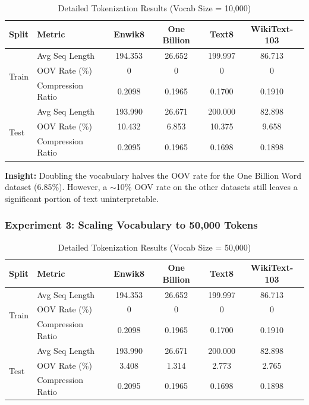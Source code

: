 \begin{table}[H]
\centering
\caption{Detailed Tokenization Results (Vocab Size = 10,000)}
\renewcommand{\arraystretch}{1.1}
\begin{tabular}{|l|l|c|c|c|c|}
\hline
\textbf{Split} & \textbf{Metric} & \textbf{Enwik8} & \textbf{One Billion} & \textbf{Text8} & \textbf{WikiText-103} \\ \hline
\multirow{3}{*}{Train} 
 & Avg Seq Length & 194.353 & 26.652 & 199.997 & 86.713 \\ \cline{2-6}
 & OOV Rate (\%) & 0 & 0 & 0 & 0 \\ \cline{2-6}
 & Compression Ratio & 0.2098 & 0.1965 & 0.1700 & 0.1910 \\ \hline
\multirow{3}{*}{Test}  
 & Avg Seq Length & 193.990 & 26.671 & 200.000 & 82.898 \\ \cline{2-6}
 & OOV Rate (\%) & 10.432 & 6.853 & 10.375 & 9.658 \\ \cline{2-6}
 & Compression Ratio & 0.2095 & 0.1965 & 0.1698 & 0.1898 \\ \hline
\end{tabular}
\end{table}

\textbf{Insight:} Doubling the vocabulary halves the OOV rate for the One Billion Word dataset (6.85\%). However, a $\sim$10\% OOV rate on the other datasets still leaves a significant portion of text uninterpretable.

\subsubsection{Experiment 3: Scaling Vocabulary to 50,000 Tokens}

\begin{table}[H]
\centering
\caption{Detailed Tokenization Results (Vocab Size = 50,000)}
\renewcommand{\arraystretch}{1.1}
\begin{tabular}{|l|l|c|c|c|c|}
\hline
\textbf{Split} & \textbf{Metric} & \textbf{Enwik8} & \textbf{One Billion} & \textbf{Text8} & \textbf{WikiText-103} \\ \hline
\multirow{3}{*}{Train} 
 & Avg Seq Length & 194.353 & 26.652 & 199.997 & 86.713 \\ \cline{2-6}
 & OOV Rate (\%) & 0 & 0 & 0 & 0 \\ \cline{2-6}
 & Compression Ratio & 0.2098 & 0.1965 & 0.1700 & 0.1910 \\ \hline
\multirow{3}{*}{Test}  
 & Avg Seq Length & 193.990 & 26.671 & 200.000 & 82.898 \\ \cline{2-6}
 & OOV Rate (\%) & 3.408 & 1.314 & 2.773 & 2.765 \\ \cline{2-6}
 & Compression Ratio & 0.2095 & 0.1965 & 0.1698 & 0.1898 \\ \hline
\end{tabular}
\end{table}

